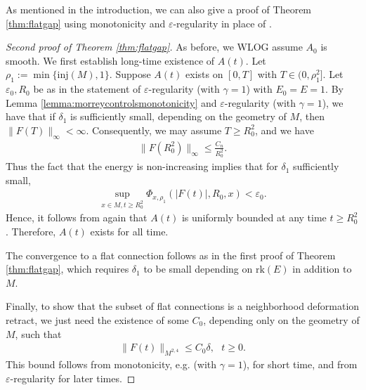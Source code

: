 \documentclass[12pt]{amsart}
\renewcommand{\1}{{\mathbf 1}}
\newcommand{\rk}{{\mathrm{rk}}}
\theoremstyle{others}
\numberwithin{equation}{section}
\begin{document}
As mentioned in the introduction, we can also give a proof of Theorem \ref{thm:flatgap} using monotonicity and $\varepsilon$-regularity in place of \cite[Theorem 1.2]{estimatespaper}.

\begin{proof}[Second proof of Theorem \ref{thm:flatgap}]
     As before, we WLOG assume \(A_0\) is smooth. We first establish long-time existence of \(A(t)\). Let $\rho_1 := \min\{\text{inj}(M), 1\}.$ Suppose \(A(t)\) exists on \([0, T]\) with \(T \in (0, \rho_1^2]\). Let \(\varepsilon_0, R_0\) be as in the statement of $\varepsilon$-regularity \cite[Theorem 6.2]{oliveirawaldron} (with \(\gamma = 1\)) with \(E_0 = E = 1\). By Lemma \ref{lemma:morreycontrolsmonotonicity} and $\varepsilon$-regularity \cite[Theorem 6.2]{oliveirawaldron} (with \(\gamma = 1\)), we have that if \(\delta_1\) is sufficiently small, depending on the geometry of \(M\), then \(\|F(T)\|_\infty < \infty\). Consequently, we may assume \(T \geq R_0^2\), and we have 
    \begin{align*}
        \|F(R_0^2)\|_\infty \leq \frac{C_n}{R_0^2}.
    \end{align*}
    Thus the fact that the energy is non-increasing implies that for \(\delta_1\) sufficiently small,
    \begin{align*}
        \sup_{x \in M, t \geq R_0^2} \Phi_{x, \rho_1}(|F(t)|, R_0, x) < \varepsilon_0.
    \end{align*} Hence, it follows from \cite[Theorem 6.2]{oliveirawaldron} again that \(A(t)\) is uniformly bounded at any time \(t \geq R_0^2\). Therefore, \(A(t)\) exists for all time. \par 
    The convergence to a flat connection follows as in the first proof of Theorem \ref{thm:flatgap}, which requires \(\delta_1\) to be small depending on $\rk(E)$ in addition to \(M\). \par 
    Finally, to show that the subset of flat connections is a neighborhood deformation retract, we just need the existence of some \(C_0\), depending only on the geometry of \(M\), such that
    \begin{align*}
        \|F(t)\|_{M^{2, 4}} \leq C_0 \delta,  \ \ \ t \geq 0.
    \end{align*} This bound follows from monotonicity, e.g. \cite[Theorem 5.7]{oliveirawaldron} (with \(\gamma = 1\)), for short time, and from $\varepsilon$-regularity for later times.
\end{proof}
\end{document}
